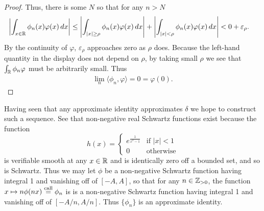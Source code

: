 \begin{proof}
      Thus, there is some $N$ so that for any $n>N$
      \begin{align*}
        \left| \int_{x\in\mathbb{R}} \phi_n(x)\varphi(x)\,dx \right|
        &\le \left| \int_{|x|\ge\rho} \phi_n(x)\varphi(x)\,dx \right|
        + \left| \int_{|x|<\rho} \phi_n(x)\varphi(x)\,dx\right|
        < 0+\varepsilon_\rho \text{.}
      \end{align*}
      By the continuity of $\varphi$, $\varepsilon_\rho$ approaches zero as $\rho$ does.
      Because the left-hand quantity in the display does not depend on $\rho$, by taking small $\rho$ we see that $\int_\mathbb{R} \phi_n\varphi$ must be arbitrarily small.
      Thus
      \begin{align*}
        \lim_n\langle\phi_n,\varphi\rangle=0=\varphi(0) \text{.}
      \end{align*}
    \end{proof}

    Having seen that any approximate identity approximates $\delta$ we hope to construct such a sequence.
    See that non-negative real Schwartz functions exist because the function
    \begin{equation}
      \label{eq:extestfcn}
      h(x) =
      \begin{cases}
        e^\frac{1}{x^2-1} &\text{if }|x|<1\\
        0 &\text{otherwise}
      \end{cases}
    \end{equation}
    is verifiable smooth at any $x\in\mathbb{R}$ and is identically zero off a bounded set, and so is Schwartz.
    Thus we may let $\phi$ be a non-negative Schwartz function having integral 1 and vanishing off of $[-A,A]$, so that for any $n\in\mathbb{Z}_{>0}$, the function $x\mapsto n\phi(nx) \overset{\text{call}}{=} \phi_n$ is is a non-negative Schwartz function having integral 1 and vanishing off of $[-A/n,A/n]$.
    Thus $\{\phi_n\}$ is an approximate identity.

